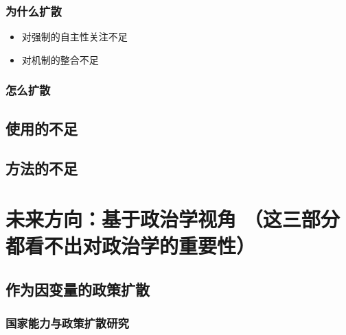 \documentclass[
  12pt,
]{ctexart}
\begin{document}
\hypertarget{ux4e3aux4ec0ux4e48ux6269ux6563}{%
\subsubsection{为什么扩散}\label{ux4e3aux4ec0ux4e48ux6269ux6563}}

\begin{itemize}
\item
  对强制的自主性关注不足
\item
  对机制的整合不足
\end{itemize}

\hypertarget{ux600eux4e48ux6269ux6563}{%
\subsubsection{怎么扩散}\label{ux600eux4e48ux6269ux6563}}

\hypertarget{ux4f7fux7528ux7684ux4e0dux8db3}{%
\subsection{使用的不足}\label{ux4f7fux7528ux7684ux4e0dux8db3}}

\hypertarget{ux65b9ux6cd5ux7684ux4e0dux8db3}{%
\subsection{方法的不足}\label{ux65b9ux6cd5ux7684ux4e0dux8db3}}

\hypertarget{ux672aux6765ux65b9ux5411ux57faux4e8eux653fux6cbbux5b66ux89c6ux89d2-ux8fd9ux4e09ux90e8ux5206ux90fdux770bux4e0dux51faux5bf9ux653fux6cbbux5b66ux7684ux91cdux8981ux6027}{%
\section{未来方向：基于政治学视角 （这三部分都看不出对政治学的重要性）}\label{ux672aux6765ux65b9ux5411ux57faux4e8eux653fux6cbbux5b66ux89c6ux89d2-ux8fd9ux4e09ux90e8ux5206ux90fdux770bux4e0dux51faux5bf9ux653fux6cbbux5b66ux7684ux91cdux8981ux6027}}

\hypertarget{ux4f5cux4e3aux56e0ux53d8ux91cfux7684ux653fux7b56ux6269ux6563}{%
\subsection{作为因变量的政策扩散}\label{ux4f5cux4e3aux56e0ux53d8ux91cfux7684ux653fux7b56ux6269ux6563}}

\hypertarget{ux56fdux5bb6ux80fdux529bux4e0eux653fux7b56ux6269ux6563ux7814ux7a76}{%
\subsubsection{国家能力与政策扩散研究}\label{ux56fdux5bb6ux80fdux529bux4e0eux653fux7b56ux6269ux6563ux7814ux7a76}}
\end{document}
